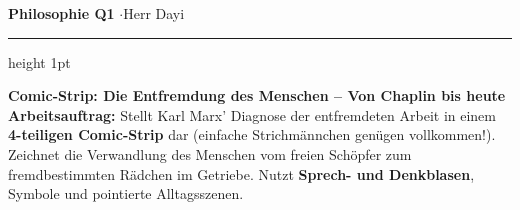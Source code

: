 \documentclass[a4paper, 10pt, landscape]{scrartcl}
\begin{document}
\noindent
\begin{minipage}[t]{0.32\textwidth}
    {\small\textbf{Philosophie Q1} \enskip$\cdot$\enskip Herr Dayi}
\end{minipage}%
\begin{minipage}[t]{0.36\textwidth}
\end{minipage}%
\begin{minipage}[t]{0.32\textwidth}
\end{minipage}

\vspace{0.12cm}
{\color{primaryBlue}\hrule height 1pt}
\vspace{0.18cm}

\noindent
\begin{tcolorbox}[
    enhanced,
    colback=lightBlue,
    colframe=primaryBlue,
    boxrule=0.8pt,
    arc=1.5mm,
    top=4pt, bottom=4pt, left=8pt, right=8pt
]
\noindent
{\large\bfseries\color{primaryBlue} Comic-Strip: Die Entfremdung des Menschen -- Von Chaplin bis heute}\\[2pt]
\footnotesize\sffamily
\textbf{Arbeitsauftrag:} Stellt Karl Marx' Diagnose der entfremdeten Arbeit in einem \textbf{4-teiligen Comic-Strip} dar (einfache Strichmännchen genügen vollkommen!). Zeichnet die Verwandlung des Menschen vom freien Schöpfer zum fremdbestimmten Rädchen im Getriebe. Nutzt \textbf{Sprech- und Denkblasen}, Symbole und pointierte Alltagsszenen.
\end{tcolorbox}

\vspace{0.18cm}
\end{document}

